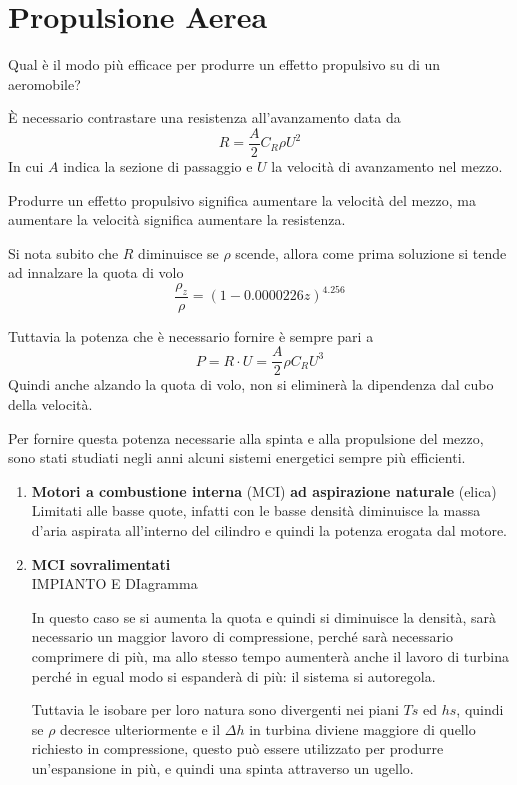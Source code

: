\part{Propulsione Aerea}
\begin{adjustwidth}{2in}{}
	Qual è il modo più efficace per produrre un effetto propulsivo su di un aeromobile?
	
	È necessario contrastare una resistenza all'avanzamento data da 
	\[R = \dfrac{A}{2}C_R\rho U^2\]
	In cui $A$ indica la sezione di passaggio e $U$ la velocità di avanzamento nel mezzo. 
	
	Produrre un effetto propulsivo significa aumentare la velocità del mezzo, ma aumentare la velocità significa aumentare la resistenza. \newline
	
	Si nota subito che $R$ diminuisce se $\rho$ scende, allora come prima soluzione si tende ad innalzare la quota di volo 
	\[\dfrac{\rho_z}{\rho} = (1-0.0000226z)^{4.256}\]
	
	Tuttavia la potenza che è necessario fornire è sempre pari a
	\[P=R \cdot U = \dfrac{A}{2}\rho C_R U^3\]
	Quindi anche alzando la quota di volo, non si eliminerà la dipendenza dal cubo della velocità. \newline 
	
	Per fornire questa potenza necessarie alla spinta e alla propulsione del mezzo, sono stati studiati negli anni alcuni sistemi energetici sempre più efficienti. 
	
	\begin{enumerate}
		\item \textbf{Motori a combustione interna} (MCI) \textbf{ad aspirazione naturale} (elica)\\
		Limitati alle basse quote, infatti con le basse densità diminuisce la massa d'aria aspirata all'interno del cilindro e quindi la potenza erogata dal motore. 
		
		\item \textbf{MCI sovralimentati}\\
		
		IMPIANTO E DIagramma 
		
		In questo caso se si aumenta la quota e quindi si diminuisce la densità, sarà necessario un maggior lavoro di compressione, perché sarà necessario comprimere di più, ma allo stesso tempo aumenterà anche il lavoro di turbina perché in egual modo si espanderà di più: il sistema si autoregola. 
		
		Tuttavia le isobare per loro natura sono divergenti nei piani $Ts$ ed $hs$, quindi se $\rho$ decresce ulteriormente e il $\Delta h$ in turbina diviene maggiore di quello richiesto in compressione, questo può essere utilizzato per produrre un'espansione in più, e quindi una spinta attraverso un ugello.
		

\end{enumerate}
\end{adjustwidth}
